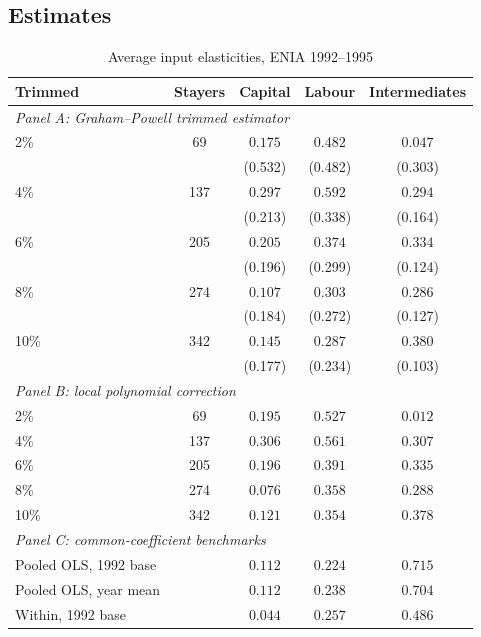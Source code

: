 \subsection{Estimates}

\begin{table}[t]
\centering
\caption{Average input elasticities, ENIA 1992--1995}
\label{tab:main}
\begin{tabular}{lcccc}
\toprule
Trimmed & Stayers & Capital & Labour & Intermediates \\
\midrule
\multicolumn{5}{l}{\emph{Panel A: Graham--Powell trimmed estimator}} \\
\phantom{0}2\% & \phantom{0}69 & $0.175$ & $0.482$ & $0.047$ \\
               &     & (0.532) & (0.482) & (0.303) \\
\phantom{0}4\% & 137 & $0.297$ & $0.592$ & $0.294$ \\
               &     & (0.213) & (0.338) & (0.164) \\
\phantom{0}6\% & 205 & $0.205$ & $0.374$ & $0.334$ \\
               &     & (0.196) & (0.299) & (0.124) \\
\phantom{0}8\% & 274 & $0.107$ & $0.303$ & $0.286$ \\
               &     & (0.184) & (0.272) & (0.127) \\
10\%           & 342 & $0.145$ & $0.287$ & $0.380$ \\
               &     & (0.177) & (0.234) & (0.103) \\
\midrule
\multicolumn{5}{l}{\emph{Panel B: local polynomial correction}} \\
\phantom{0}2\% & \phantom{0}69 & $0.195$ & $0.527$ & $0.012$ \\
\phantom{0}4\% & 137 & $0.306$ & $0.561$ & $0.307$ \\
\phantom{0}6\% & 205 & $0.196$ & $0.391$ & $0.335$ \\
\phantom{0}8\% & 274 & $0.076$ & $0.358$ & $0.288$ \\
10\%           & 342 & $0.121$ & $0.354$ & $0.378$ \\
\midrule
\multicolumn{5}{l}{\emph{Panel C: common-coefficient benchmarks}} \\
Pooled OLS, 1992 base & & $0.112$ & $0.224$ & $0.715$ \\
Pooled OLS, year mean & & $0.112$ & $0.238$ & $0.704$ \\
Within, 1992 base     & & $0.044$ & $0.257$ & $0.486$ \\
\bottomrule
\end{tabular}


\end{table}
